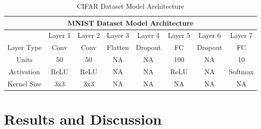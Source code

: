 \begin{table}[h]
\caption{CIFAR Dataset Model Architecture} \label{tab:CIFARArchitecture}
\begin{tabular}{|c||c|c|c|c|c|c|c|}
\hline
\multicolumn{8}{|c|}{MNIST Dataset Model Architecture} \\
\hline
 & Layer 1 & Layer 2 & Layer 3& Layer 4 &Layer 5 & Layer 6 & Layer 7 \\
\hline
\hline
Layer Type & Conv & Conv & Flatten & Dropout & FC & Dropout  & FC \\
\hline
Units & 50 & 50 & NA & NA & 100 & NA & 10 \\
\hline
Activation & ReLU &ReLU & NA & NA & ReLU & NA & Softmax \\
\hline
Kernel Size & 3x3 &3x3 & NA &NA &NA &NA &NA  \\
\hline
\end{tabular}
\end{table}


\section{Results and Discussion}